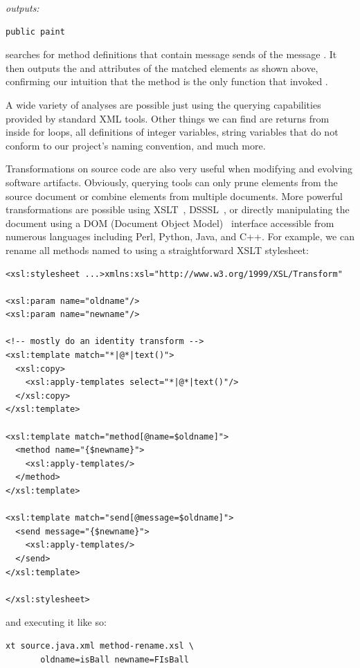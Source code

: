 \documentclass{article}
\begin{document}
\begin{multicols}{2}
{\noindent\emph{outputs:}
\begin{verbatim}
public paint
\end{verbatim}
}

\noindent searches for method definitions that contain message sends of the
message .  It then outputs the
 and  attributes of the matched
elements as shown above, confirming our intuition that the
 method is the only function that invoked .

A wide variety of analyses are possible just using the querying
capabilities provided by standard XML tools.  Other things we can find
are returns from inside for loops, all definitions of integer variables,
string variables that do not conform to our project's naming convention,
and much more.

Transformations on source code are also very useful when modifying and
evolving software artifacts.  Obviously, querying tools can only prune
elements from the source document or combine elements from multiple
documents.  More powerful transformations are possible using
XSLT~\cite{XSLT}, DSSSL~\cite{DSSSL}, or directly manipulating the
document using a DOM (Document Object Model)~\cite{DOM} interface
accessible from numerous languages including Perl, Python, Java, and
C++.  For example, we can rename all methods named  to
 using a straightforward XSLT stylesheet:

{ \small
\begin{verbatim}
<xsl:stylesheet ...>xmlns:xsl="http://www.w3.org/1999/XSL/Transform"

<xsl:param name="oldname"/>
<xsl:param name="newname"/>

<!-- mostly do an identity transform -->
<xsl:template match="*|@*|text()">
  <xsl:copy>
    <xsl:apply-templates select="*|@*|text()"/>
  </xsl:copy>
</xsl:template>

<xsl:template match="method[@name=$oldname]">
  <method name="{$newname}">
    <xsl:apply-templates/>
  </method>
</xsl:template>

<xsl:template match="send[@message=$oldname]">
  <send message="{$newname}">
    <xsl:apply-templates/>
  </send>
</xsl:template>

</xsl:stylesheet>
\end{verbatim}
}

\noindent and executing it like so:

\begin{verbatim}
xt source.java.xml method-rename.xsl \
       oldname=isBall newname=FIsBall
\end{verbatim}


\end{multicols}
\end{document}
